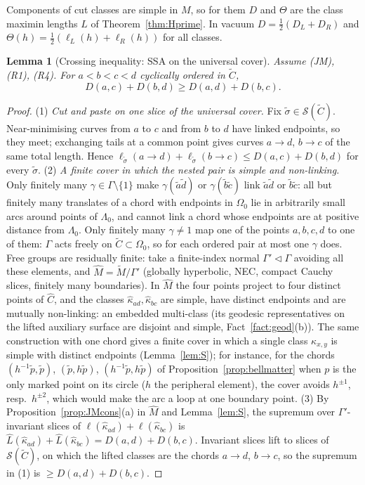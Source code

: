 \documentclass[aps,prd,onecolumn,superscriptaddress,nofootinbib,amsmath,amssymb,11pt]{revtex4-2}
\newtheorem{lemma}[theorem]{Lemma}
\theoremstyle{definition}
\begin{document}
Components of cut classes are simple in $M$, so for them $D$ and $\Theta$ are the class maximin lengths $L$ of
Theorem~\ref{thm:Hprime}. In vacuum $D=\frac12(D_L+D_R)$ and $\Theta(h)=\frac12(\ell_L(h)+\ell_R(h))$ for all classes.

\begin{lemma}[Crossing inequality: SSA on the universal cover]\label{lem:X}
Assume (JM), (R1), (R4). For $a<b<c<d$ cyclically ordered in $\tilde C$,
\[
D(a,c)+D(b,d)\ge D(a,d)+D(b,c).
\]
\end{lemma}

\begin{proof}
(1) \emph{Cut and paste on one slice of the universal cover.} Fix $\tilde\sigma\in\mathcal S(\tilde C)$. Near-minimising curves from
$a$ to $c$ and from $b$ to $d$ have linked endpoints, so they meet; exchanging tails at a common point gives curves $a\to d$,
$b\to c$ of the same total length. Hence $\ell_{\tilde\sigma}(a\to d)+\ell_{\tilde\sigma}(b\to c)\le D(a,c)+D(b,d)$ for every $\tilde\sigma$.
(2) \emph{A finite cover in which the nested pair is simple and non-linking.} Only finitely many $\gamma\in\Gamma\setminus\{1\}$
make $\gamma(\tilde a\tilde d)$ or $\gamma(\tilde b\tilde c)$ link $\tilde a\tilde d$ or $\tilde b\tilde c$: all but finitely many translates of a
chord with endpoints in $\Omega_0$ lie in arbitrarily small arcs around points of $\Lambda_0$, and cannot link a chord whose
endpoints are at positive distance from $\Lambda_0$. Only finitely many $\gamma\ne1$ map one of the points $a,b,c,d$ to one of
them: $\Gamma$ acts freely on $\tilde C\subset\Omega_0$, so for each ordered pair at most one $\gamma$ does. Free groups are residually finite: take a finite-index normal $\Gamma'\lhd\Gamma$ avoiding all these elements, and
$\widehat M=\tilde M/\Gamma'$ (globally hyperbolic, NEC, compact Cauchy slices, finitely many boundaries). In $\widehat M$ the four
points project to four distinct points of $\widehat C$, and the classes $\hat\kappa_{ad},\hat\kappa_{bc}$ are simple, have distinct
endpoints and are mutually non-linking: an embedded multi-class (its geodesic representatives on the lifted auxiliary
surface are disjoint and simple, Fact~\ref{fact:geod}(b)). The same construction with one chord gives a finite cover in
which a single class $\kappa_{x,y}$ is simple with distinct endpoints (Lemma~\ref{lem:S}); for instance, for the chords
$(h^{-1}\tilde p,\tilde p)$, $(\tilde p,h\tilde p)$, $(h^{-1}\tilde p,h\tilde p)$ of Proposition~\ref{prop:bellmatter} when $p$ is the only
marked point on its circle ($h$ the peripheral element), the cover avoids $h^{\pm1}$, resp.\ $h^{\pm2}$, which would make the arc a
loop at one boundary point.
(3) By Proposition~\ref{prop:JMcons}(a) in $\widehat M$ and Lemma~\ref{lem:S}, the supremum over $\Gamma'$-invariant slices of
$\ell(\hat\kappa_{ad})+\ell(\hat\kappa_{bc})$ is $\hat L(\hat\kappa_{ad})+\hat L(\hat\kappa_{bc})=D(a,d)+D(b,c)$. Invariant slices lift to
slices of $\mathcal S(\tilde C)$, on which the lifted classes are the chords $a\to d$, $b\to c$, so the supremum in (1) is $\ge
D(a,d)+D(b,c)$.
\end{proof}
\end{document}
